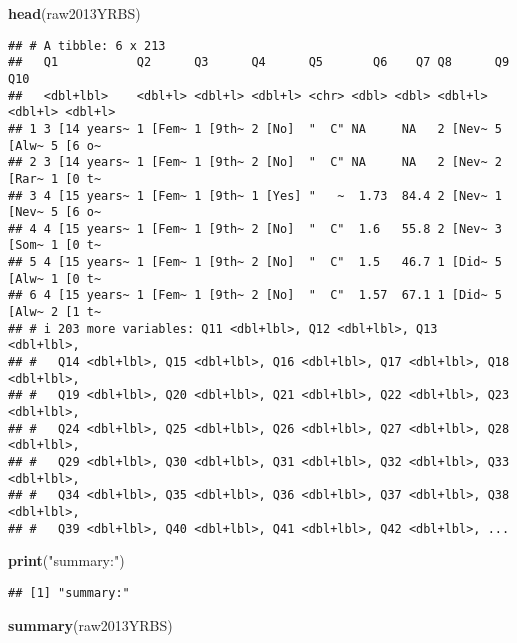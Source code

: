 \documentclass[
]{article}
\newenvironment{Shaded}{\begin{snugshade}}{\end{snugshade}}
\newcommand{\FunctionTok}[1]{\textcolor[rgb]{0.13,0.29,0.53}{\textbf{#1}}}
\newcommand{\NormalTok}[1]{#1}
\newcommand{\StringTok}[1]{\textcolor[rgb]{0.31,0.60,0.02}{#1}}
\begin{document}
\begin{Shaded}
\begin{Highlighting}[]
\FunctionTok{head}\NormalTok{(raw2013YRBS)}
\end{Highlighting}
\end{Shaded}

\begin{verbatim}
## # A tibble: 6 x 213
##   Q1           Q2      Q3      Q4      Q5       Q6    Q7 Q8      Q9      Q10    
##   <dbl+lbl>    <dbl+l> <dbl+l> <dbl+l> <chr> <dbl> <dbl> <dbl+l> <dbl+l> <dbl+l>
## 1 3 [14 years~ 1 [Fem~ 1 [9th~ 2 [No]  "  C" NA     NA   2 [Nev~ 5 [Alw~ 5 [6 o~
## 2 3 [14 years~ 1 [Fem~ 1 [9th~ 2 [No]  "  C" NA     NA   2 [Nev~ 2 [Rar~ 1 [0 t~
## 3 4 [15 years~ 1 [Fem~ 1 [9th~ 1 [Yes] "   ~  1.73  84.4 2 [Nev~ 1 [Nev~ 5 [6 o~
## 4 4 [15 years~ 1 [Fem~ 1 [9th~ 2 [No]  "  C"  1.6   55.8 2 [Nev~ 3 [Som~ 1 [0 t~
## 5 4 [15 years~ 1 [Fem~ 1 [9th~ 2 [No]  "  C"  1.5   46.7 1 [Did~ 5 [Alw~ 1 [0 t~
## 6 4 [15 years~ 1 [Fem~ 1 [9th~ 2 [No]  "  C"  1.57  67.1 1 [Did~ 5 [Alw~ 2 [1 t~
## # i 203 more variables: Q11 <dbl+lbl>, Q12 <dbl+lbl>, Q13 <dbl+lbl>,
## #   Q14 <dbl+lbl>, Q15 <dbl+lbl>, Q16 <dbl+lbl>, Q17 <dbl+lbl>, Q18 <dbl+lbl>,
## #   Q19 <dbl+lbl>, Q20 <dbl+lbl>, Q21 <dbl+lbl>, Q22 <dbl+lbl>, Q23 <dbl+lbl>,
## #   Q24 <dbl+lbl>, Q25 <dbl+lbl>, Q26 <dbl+lbl>, Q27 <dbl+lbl>, Q28 <dbl+lbl>,
## #   Q29 <dbl+lbl>, Q30 <dbl+lbl>, Q31 <dbl+lbl>, Q32 <dbl+lbl>, Q33 <dbl+lbl>,
## #   Q34 <dbl+lbl>, Q35 <dbl+lbl>, Q36 <dbl+lbl>, Q37 <dbl+lbl>, Q38 <dbl+lbl>,
## #   Q39 <dbl+lbl>, Q40 <dbl+lbl>, Q41 <dbl+lbl>, Q42 <dbl+lbl>, ...
\end{verbatim}

\begin{Shaded}
\begin{Highlighting}[]
\FunctionTok{print}\NormalTok{(}\StringTok{"summary:"}\NormalTok{)}
\end{Highlighting}
\end{Shaded}

\begin{verbatim}
## [1] "summary:"
\end{verbatim}

\begin{Shaded}
\begin{Highlighting}[]
\FunctionTok{summary}\NormalTok{(raw2013YRBS)}
\end{Highlighting}
\end{Shaded}
\end{document}
